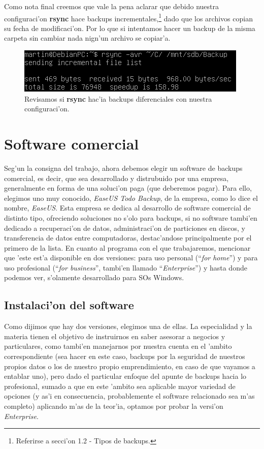 \documentclass[11pt]{article}
\newcommand{\rsync}[0]{\textbf{rsync}}
\begin{document}
		Como nota final creemos que vale la pena aclarar que debido nuestra configuraci'on \rsync{} hace backups incrementales,\footnote{Referirse a secci'on 1.2 - Tipos de backups.} dado que los archivos copian su fecha de modificaci'on. Por lo que si intentamos hacer un backup de la misma carpeta sin cambiar nada nign'un archivo se copiar'a.

		\begin{figure}[H]
			\centering
			\includegraphics[scale=0.7]{Images/rsync/rsync_backup_incremental.PNG}
			\caption{Revisamos si \rsync{} hac'ia backups diferenciales con nuestra configuraci'on.}
			\label{fig:rsync_backup_incremental}
		\end{figure}

	\section{Software comercial}
	Seg'un la consigna del trabajo, ahora debemos elegir un software de backups comercial, es decir, que sea desarrollado y distrubuido por una empresa, generalmente en forma de una soluci'on paga (que deberemos pagar). Para ello, elegimos uno muy conocido, \textit{EaseUS Todo Backup}, de la empresa, como lo dice el nombre, \textit{EaseUS}. Esta empresa se dedica al desarrollo de software comercial de distinto tipo, ofreciendo soluciones no s'olo para backups, si no software tambi'en dedicado a recuperaci'on de datos, administraci'on de particiones en discos, y transferencia de datos entre computadoras, destac'andose principalmente por el primero de la lista. En cuanto al programa con el que trabajaremos, mencionar que 'este est'a disponible en dos versiones: para uso personal (``\textit{for home}'') y para uso profesional (``\textit{for business}'', tambi'en llamado ``\textit{Enterprise}'') y hasta donde podemos ver, s'olamente desarrollado para SOs Windows.
	
	\subsection{Instalaci'on del software}
	Como dijimos que hay dos versiones, elegimos una de ellas. La especialidad y la materia tienen el objetivo de instruirnos en saber asesorar a negocios y particulares, como tambi'en manejarnos por nuestra cuenta en el 'ambito correspondiente (sea hacer en este caso, backups por la seguridad de nuestros propios datos o los de nuestro propio emprendimiento, en caso de que vayamos a entablar uno), pero dado el particular enfoque del apunte de backups hacia lo profesional, sumado a que en este 'ambito sea aplicable mayor variedad de opciones (y as'i en consecuencia, probablemente el software relacionado sea m'as completo) aplicando m'as de la teor'ia, optamos por probar la versi'on \textit{Enterprise}.
	
\end{document}

